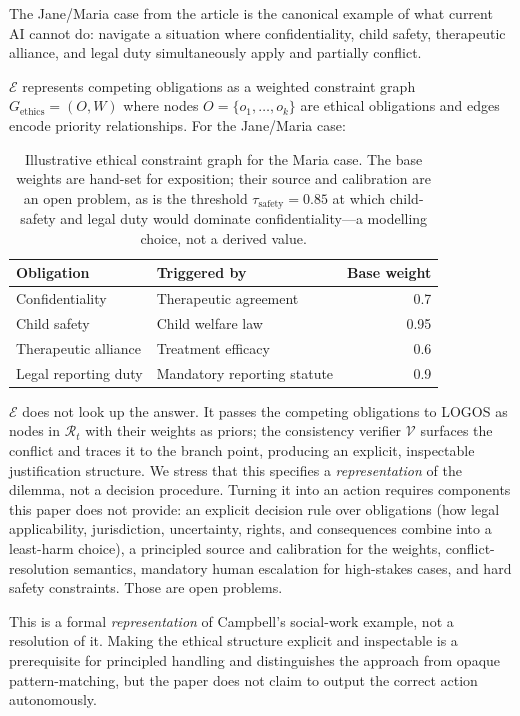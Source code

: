 \documentclass[12pt]{article}
\begin{document}
The Jane/Maria case from the article \cite{beccue2024} is the canonical example of what current AI cannot do: navigate a situation where confidentiality, child safety, therapeutic alliance, and legal duty simultaneously apply and partially conflict.

$\mathcal{E}$ represents competing obligations as a weighted constraint graph $G_{\text{ethics}} = (O, W)$ where nodes $O = \{o_1, \ldots, o_k\}$ are ethical obligations and edges encode priority relationships. For the Jane/Maria case:

\begin{table}[H]
\centering\small
\begin{tabular}{llr}
\toprule
\textbf{Obligation} & \textbf{Triggered by} & \textbf{Base weight} \\
\midrule
Confidentiality & Therapeutic agreement & 0.7 \\
Child safety & Child welfare law & 0.95 \\
Therapeutic alliance & Treatment efficacy & 0.6 \\
Legal reporting duty & Mandatory reporting statute & 0.9 \\
\bottomrule
\end{tabular}
\caption{Illustrative ethical constraint graph for the Maria case. The base weights are hand-set for exposition; their source and calibration are an open problem, as is the threshold $\tau_{\text{safety}} = 0.85$ at which child-safety and legal duty would dominate confidentiality---a modelling choice, not a derived value.}
\end{table}

$\mathcal{E}$ does not look up the answer. It passes the competing obligations to LOGOS as nodes in $\mathcal{R}_t$ with their weights as priors; the consistency verifier $\mathcal{V}$ surfaces the conflict and traces it to the branch point, producing an explicit, inspectable justification structure. We stress that this specifies a \emph{representation} of the dilemma, not a decision procedure. Turning it into an action requires components this paper does not provide: an explicit decision rule over obligations (how legal applicability, jurisdiction, uncertainty, rights, and consequences combine into a least-harm choice), a principled source and calibration for the weights, conflict-resolution semantics, mandatory human escalation for high-stakes cases, and hard safety constraints. Those are open problems.

This is a formal \emph{representation} of Campbell's social-work example, not a resolution of it. Making the ethical structure explicit and inspectable is a prerequisite for principled handling and distinguishes the approach from opaque pattern-matching, but the paper does not claim to output the correct action autonomously.
\end{document}
